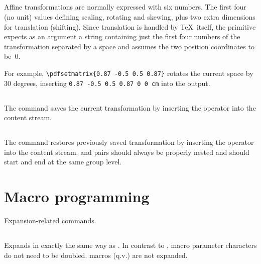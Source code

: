 \documentclass{pdftexmanual}
\begin{document}
\subsection{}

Affine transformations are normally expressed with six numbers. The
first four (no unit) values defining scaling, rotating and skewing, plus
two extra dimensions for translation (shifting). Since translation is
handled by \TeX\ itself, the  primitive expects as an
argument a string containing just the first four numbers of the
transformation separated by a space and assumes the two position
coordinates to be~0.

For example, \verb|\pdfsetmatrix{0.87 -0.5 0.5 0.87}| rotates the
current space by 30 degrees, inserting
\verb|0.87 -0.5 0.5 0.87 0 0 cm| into the output. 

\subsection{}

The command saves the current transformation by inserting the 
operator into the content stream. 

\subsection{}

The command restores previously saved transformation by inserting the
 operator into the content stream.  and
 pairs should always be properly nested and should start
and end at the same group level. 

\section{Macro programming}

Expansion-related commands.

\subsection{}

Expands  in exactly the same way as . In
contrast to , macro parameter characters do not need to be
doubled.  macros (q.v.) are not expanded.
\end{document}
